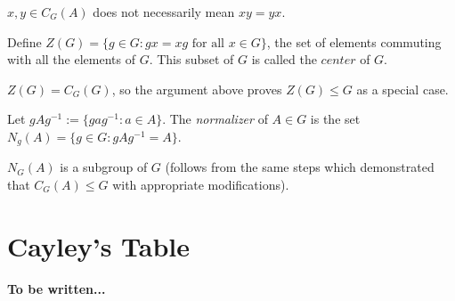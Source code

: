 \begin{note}
    $x, y \in C_G(A)$ does not necessarily mean $xy = yx$.
\end{note}
\begin{definition}[Center]
    \label{def:center}
    Define $Z(G) = \{g \in G: gx = xg \text{ for all } x \in G\}$, the set of elements commuting with all the elements of $G$. This subset of $G$ is called the $center$ of $G$.     
\end{definition}
\begin{note}
    $Z(G) = C_G(G)$, so the argument above proves $Z(G) \le G$ as a special case.   
\end{note}
\begin{definition}[Normalizer]
    Let $g A g^{-1} := \{g a g^{-1} : a \in A\}$. The \textit{normalizer} of $A \in G$ is the set $N_g(A) = \{g  \in G : g A g^{-1} = A\}$.  
\end{definition}
$N_G(A)$ is a subgroup of $G$ (follows from the same steps which demonstrated that $C_G(A) \le G$ with appropriate modifications).
\section{Cayley's Table}
\textbf{To be written...}